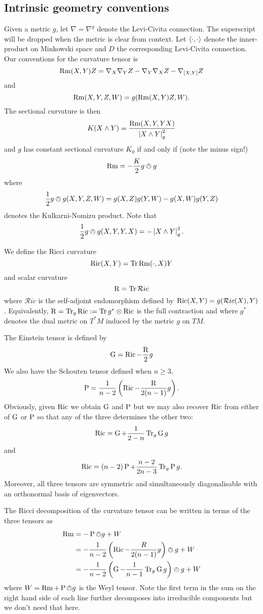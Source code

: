 \documentclass[a4paper, 12pt]{amsart}
\begin{document}
\subsection{Intrinsic geometry conventions}
\label{subsec:notation_intrinsic}

Given a metric \(g\), let \(\nabla = \nabla^g\) denote the Levi-Civita connection. The superscript will be dropped when the metric is clear from context. Let \(\left\langle \cdot,\cdot \right\rangle\) denote the inner-product on Minkowski space and \(D\) the corresponding Levi-Civita connection. Our conventions for the curvature tensor is
\[
\operatorname{Rm}(X, Y) Z = \nabla_X \nabla_Y Z - \nabla_Y \nabla_X Z - \nabla_{[X, Y]} Z
\]
and
\[
\operatorname{Rm}(X, Y, Z, W) = g(\operatorname{Rm}(X, Y) Z, W).
\]
The sectional curvature is then
\[
K(X \wedge Y) = \frac{\operatorname{Rm}(X, Y, Y X)}{\left\lvert{X \wedge Y}\right\rvert_g^2}
\]
and \(g\) has constant sectional curvature \(K_0\) if and only if (note the minus sign!)
\[
\operatorname{Rm} = -\frac{K}{2} g \owedge g
\]
where
\[
\frac{1}{2} g \owedge g (X, Y, Z, W) = g(X, Z) g (Y, W) - g(X, W) g(Y, Z)
\]
denotes the Kulkarni-Nomizu product. Note that
\[
\frac{1}{2} g \owedge g (X, Y, Y, X) = -\left\lvert{X \wedge Y}\right\rvert_g^2.
\]

We define the Ricci curvature
\[
\operatorname{Ric}(X, Y) = \operatorname{Tr} \operatorname{Rm}(\cdot, X) Y
\]
and scalar curvature
\[
\operatorname{R} = \operatorname{Tr} \mathcal{R}ic
\]
where \(\mathcal{R}ic\) is the self-adjoint endomorphism defined by \(\operatorname{Ric}(X, Y) = g(\mathcal{R}ic(X), Y)\). Equivalently, \(\operatorname{R} = \operatorname{Tr}_g \operatorname{Ric} := \operatorname{Tr} g^{\ast} \otimes \operatorname{Ric}\) is the full contraction and where \(g^{\ast}\) denotes the dual metric on \(T^{\ast}M\) induced by the metric \(g\) on \(TM\).

The Einstein tensor is defined by
\[
\operatorname{G} = \operatorname{Ric} - \frac{\operatorname{R}}{2} g
\]
We also have the Schouten tensor defined when \(n \geq 3\),
\[
\operatorname{P} = \frac{1}{n-2} \left(\operatorname{Ric} - \frac{\operatorname{R}}{2(n-1)}g \right).
\]
Obviously, given \(\operatorname{Ric}\) we obtain \(\operatorname{G}\) and \(\operatorname{P}\) but we may also recover \(\operatorname{Ric}\) from either of \(\operatorname{G}\) or \(\operatorname{P}\) so that any of the three determines the other two:
\[
\operatorname{Ric} = \operatorname{G} + \frac{1}{2-n} \operatorname{Tr}_g \operatorname{G} g
\]
and
\[
\operatorname{Ric} = (n-2) \operatorname{P} + \frac{n-2}{2n-3} \operatorname{Tr}_g \operatorname{P} g.
\]
Moreover, all three tensors are symmetric and simultaneously diagonalisable with an orthonormal basis of eigenvectors.

The Ricci decomposition of the curvature tensor can be written in terms of the three tensors as
\begin{align*}
\operatorname{Rm} &= -\operatorname{P} \owedge g + W \\
&= -\frac{1}{n-2} \left(\operatorname{Ric} - \frac{R}{2(n-1)} g\right) \owedge g + W \\
&= -\frac{1}{n-2} \left(\operatorname{G}  -\frac{1}{n-1} \operatorname{Tr}_g \operatorname{G} g\right) \owedge g + W
\end{align*}
where \(W = \operatorname{Rm} + \operatorname{P} \owedge g\) is the Weyl tensor. Note the first term in the sum on the right hand side of each line further decomposes into irreducible components but we don't need that here.
\end{document}
